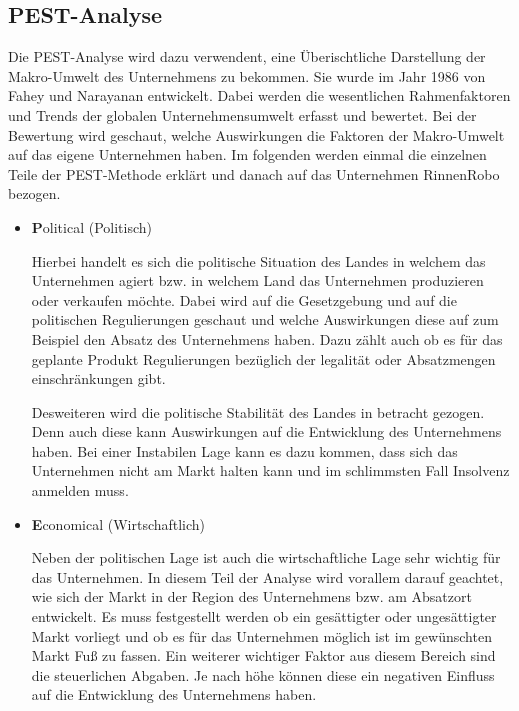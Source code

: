         \subsection{PEST-Analyse} \label{pest}
            Die PEST-Analyse wird dazu verwendent, eine Überischtliche Darstellung der Makro-Umwelt des Unternehmens zu
            bekommen. Sie wurde im Jahr 1986 von Fahey und Narayanan entwickelt. Dabei werden die wesentlichen 
            Rahmenfaktoren und Trends der globalen Unternehmensumwelt erfasst und bewertet. Bei der Bewertung wird
            geschaut, welche Auswirkungen die Faktoren der Makro-Umwelt auf das eigene Unternehmen haben. Im folgenden 
            werden einmal die einzelnen Teile der PEST-Methode erklärt und danach auf das Unternehmen RinnenRobo
            bezogen.
    
            \begin{itemize}
                \item \textbf Political (Politisch)
    
                    Hierbei handelt es sich die politische Situation des Landes in welchem das Unternehmen agiert bzw. 
                    in welchem Land das Unternehmen produzieren oder verkaufen möchte. Dabei wird auf die Gesetzgebung 
                    und auf die politischen Regulierungen geschaut und welche Auswirkungen diese auf zum Beispiel den Absatz
                    des Unternehmens haben. Dazu zählt auch ob es für das geplante Produkt Regulierungen bezüglich der 
                    legalität oder Absatzmengen einschränkungen gibt.
    
                    Desweiteren wird die politische Stabilität des Landes in betracht gezogen. Denn auch diese kann 
                    Auswirkungen auf die Entwicklung des Unternehmens haben. Bei einer Instabilen Lage kann es dazu kommen,
                    dass sich das Unternehmen nicht am Markt halten kann und im schlimmsten Fall Insolvenz anmelden muss.
    
                \item \textbf Economical (Wirtschaftlich)
                
                    Neben der politischen Lage ist auch die wirtschaftliche Lage sehr wichtig für das Unternehmen. In diesem
                    Teil der Analyse wird vorallem darauf geachtet, wie sich der Markt in der Region des Unternehmens bzw. 
                    am Absatzort entwickelt. Es muss festgestellt werden ob ein gesättigter oder ungesättigter Markt 
                    vorliegt und ob es für das Unternehmen möglich ist im gewünschten Markt Fuß zu fassen. Ein weiterer 
                    wichtiger Faktor aus diesem Bereich sind die steuerlichen Abgaben. Je nach höhe können diese ein 
                    negativen Einfluss auf die Entwicklung des Unternehmens haben.
    

\end{itemize}
